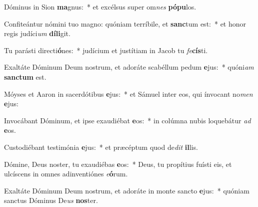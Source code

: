 \item Dóminus in Sion \textbf{ma}gnus:~* et excélsus super om\textit{nes} \textbf{pó}\textbf{pu}los.
\item Confiteántur nómini tuo magno: quóniam terríbile, et \textbf{sanc}tum est:~* et honor regis judíci\textit{um} \textbf{dí}\textbf{li}git.
\item Tu parásti directi\textbf{ó}nes:~* judícium et justítiam in Jacob tu \textit{fe}\textbf{cís}ti.
\item Exaltáte Dóminum Deum nostrum, et adoráte scabéllum pedum \textbf{e}jus:~* quóni\textit{am} \textbf{sanc}\textbf{tum} est.
\item Móyses et Aaron in sacerdótibus \textbf{e}jus:~* et Sámuel inter eos, qui ínvocant no\textit{men} \textbf{e}jus:
\item Invocábant Dóminum, et ipse exaudiébat \textbf{e}os:~* in colúmna nubis loquebátur \textit{ad} \textbf{e}os.
\item Custodiébant testimónia \textbf{e}jus:~* et præcéptum quod de\textit{dit} \textbf{il}lis.
\item Dómine, Deus noster, tu exaudiébas \textbf{e}os:~* Deus, tu propítius fuísti eis, et ulcíscens in omnes adinventiónes \textit{e}\textbf{ó}rum.
\item Exaltáte Dóminum Deum nostrum, et adoráte in monte sancto \textbf{e}jus:~* quóniam sanctus Dóminus De\textit{us} \textbf{nos}ter.

